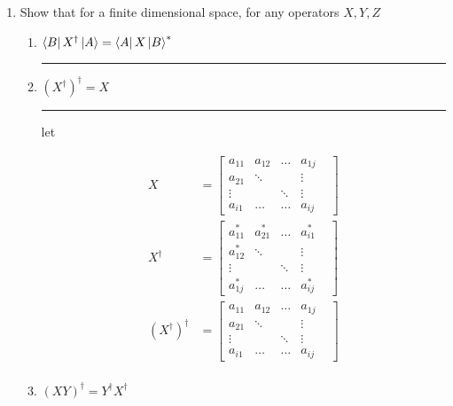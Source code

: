 \documentclass[12pt, oneside]{article}
\newenvironment{answer}
  {\vspace*{0.2cm} \rule{12cm}{0.02cm} \vspace*{0.2cm}}
  {\vspace*{0.2cm}}
\begin{document}
\begin{enumerate}
  \item Show that for a finite dimensional space, for any operators $X, Y, Z$

  \begin{enumerate}
    \item $\bra{B}X^\dagger\ket{A} = \bra{A}X\ket{B}^*$

    \begin{answer}

    \end{answer}

    \item $(X^\dagger)^\dagger = X$

    \begin{answer}
      let

      \begin{align*}
        X &= \begin{bmatrix}
                a_{11} & a_{12} & \dots  & a_{1j} &\\
                a_{21} & \ddots &        & \vdots &\\
                \vdots &        & \ddots & \vdots &\\
                a_{i1} & \dots  &  \dots & a_{ij} &
             \end{bmatrix}\\
        X^\dagger &= \begin{bmatrix}
                a_{11}^* & a_{21}^* & \dots  & a_{i1}^* &\\
                a_{12}^*  & \ddots  &        & \vdots &\\
                \vdots    &         & \ddots & \vdots &\\
                a_{1j}^*  & \dots  &  \dots  & a_{ij}^* &
            \end{bmatrix}\\
        (X^\dagger)^\dagger &= \begin{bmatrix}
                a_{11} & a_{12} & \dots  & a_{1j} &\\
                a_{21} & \ddots &        & \vdots &\\
                \vdots &        & \ddots & \vdots &\\
                a_{i1} & \dots  &  \dots & a_{ij} &
             \end{bmatrix}\\
      \end{align*}
    \end{answer}

    \item $(XY)^\dagger = Y^\dagger X^\dagger$


\end{enumerate}
\end{enumerate}
\end{document}
